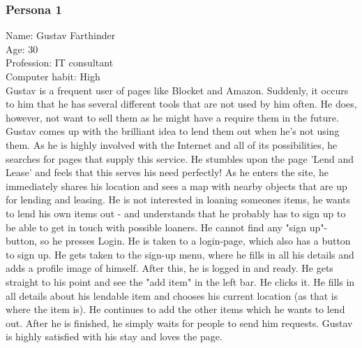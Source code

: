 \documentclass[a4paper]{article}
\begin{document}
\subsubsection{Persona 1}
Name: Gustav Farthinder \\
Age: 30 \\
Profession: IT consultant \\
Computer habit: High \\
\newline Gustav is a frequent user of pages like Blocket and Amazon. Suddenly, it occurs to him that he has several different
tools that are not used by him often. He does, however, not want to sell them as he might have a require them in
the future. Gustav comes up with the brilliant idea to lend them out when he's not using them. As he is highly involved
with the Internet and all of its possibilities, he searches for pages that supply this service.
He stumbles upon the page 'Lend and Lease' and feels that this serves his need perfectly!
As he enters the site, he immediately shares his location and sees a map with nearby objects that are up for lending and leasing.
He is not interested in loaning someones items, he wants to lend his own items out - and understands that he probably has to sign
up to be able to get in touch with possible loaners. He cannot find any "sign up"-button, so he presses Login.
He is taken to a login-page, which also has a button to sign up. He gets taken to the sign-up menu, where he fills in all his details
and adds a profile image of himself. After this, he is logged in and ready. He gets straight to his point and see the "add item" in the
left bar. He clicks it. He fills in all details about his lendable item and chooses his current location (as that is where the item is).
He continues to add the other items which he wants to lend out. After he is finished, he simply waits for people to send him requests.
Gustav is highly satisfied with his stay and loves the page.
\end{document}
